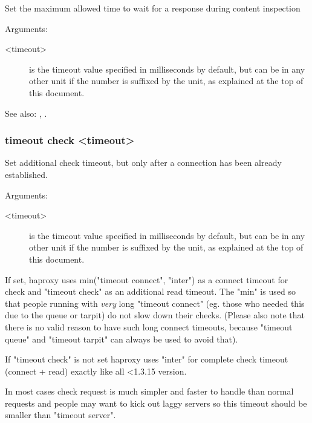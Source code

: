 
  Set the maximum allowed time to wait for a response during content inspection


  Arguments:
  \begin{description}
  \item[<timeout>] is the timeout value specified in milliseconds by default, but
              can be in any other unit if the number is suffixed by the unit,
              as explained at the top of this document.
  \end{description}

  See also: , .

\subsubsection[timeout check]{timeout check <timeout>}


  Set additional check timeout, but only after a connection has been already
  established.


  Arguments:
  \begin{description}
  \item[<timeout>] is the timeout value specified in milliseconds by default, but
              can be in any other unit if the number is suffixed by the unit,
              as explained at the top of this document.
  \end{description}

  If set, haproxy uses min("timeout connect", "inter") as a connect timeout
  for check and "timeout check" as an additional read timeout. The "min" is
  used so that people running with \emph{very} long "timeout connect" (eg. those
  who needed this due to the queue or tarpit) do not slow down their checks.
  (Please also note that there is no valid reason to have such long connect
  timeouts, because "timeout queue" and "timeout tarpit" can always be used to
  avoid that).

  If "timeout check" is not set haproxy uses "inter" for complete check
  timeout (connect + read) exactly like all <1.3.15 version.

  In most cases check request is much simpler and faster to handle than normal
  requests and people may want to kick out laggy servers so this timeout should
  be smaller than "timeout server".


